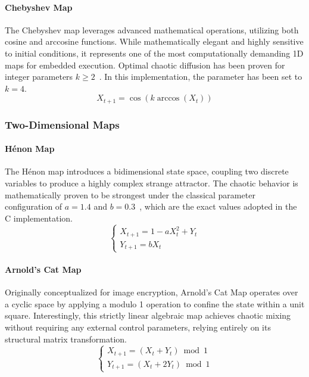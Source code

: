 \documentclass[11pt,a4paper]{report}
\begin{document}
\paragraph{Chebyshev Map}
The Chebyshev map leverages advanced mathematical operations, utilizing both cosine and arccosine functions. 
While mathematically elegant and highly sensitive to initial conditions, it represents one of the most computationally demanding 1D maps for embedded execution. 
Optimal chaotic diffusion has been proven for integer parameters $k \ge 2$~\cite{chebyshevDefaultParameters}. 
In this implementation, the parameter has been set to $k = 4$.
\begin{equation}
    X_{t+1} = \cos(k \arccos(X_t))
    \label{eq:chebyshev_map}
\end{equation}

\subsubsection{Two-Dimensional Maps}

\paragraph{Hénon Map}
The Hénon map introduces a bidimensional state space, coupling two discrete variables to produce a highly complex strange attractor. 
The chaotic behavior is mathematically proven to be strongest under the classical parameter configuration of $a = 1.4$ and $b = 0.3$~\cite{henonDefaultParameters}, which are the exact values adopted in the C implementation.
\begin{equation}
    \begin{cases}
        X_{t+1} = 1 - a X_t^2 + Y_t \\[4pt]
        Y_{t+1} = b X_t
    \end{cases}
    \label{eq:henon_map}
\end{equation}

\paragraph{Arnold's Cat Map}
Originally conceptualized for image encryption, Arnold's Cat Map operates over a cyclic space by applying a modulo 1 operation to confine the state within a unit square. 
Interestingly, this strictly linear algebraic map achieves chaotic mixing without requiring any external control parameters, relying entirely on its structural matrix transformation.
\begin{equation}
    \begin{cases}
        X_{t+1} = (X_t + Y_t) \bmod 1 \\[4pt]
        Y_{t+1} = (X_t + 2Y_t) \bmod 1
    \end{cases}
    \label{eq:arnold_cat_map}
\end{equation}
\end{document}
